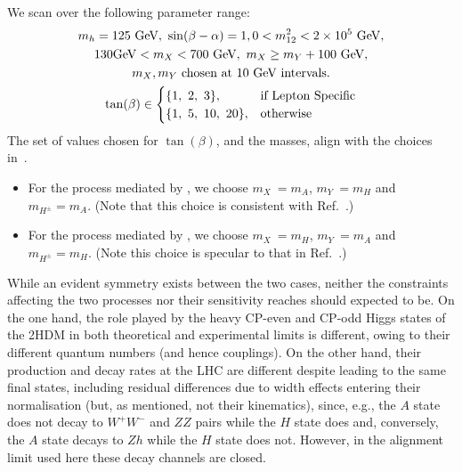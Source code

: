 We scan over the following parameter range:
\begin{equation}
\begin{gathered}
     m_{h} = 125~\text{GeV},~\sin(\beta-\alpha)=1, 0 < m_{12}^2 < 2\times 10^5~{\rm GeV},\\
     130 {\rm GeV} < m_X < 700~\text{GeV},~m_X \geq m_Y + 100~\text{GeV},\\
     m_X, m_Y~\text{chosen at}~10~\text{GeV intervals.}\\
     \tan(\beta)\in
         \begin{cases}
             \{1,~2,~3\}, & \text{if Lepton Specific}\\
             \{1,~5,~10,~20\}, & \text{otherwise}\\
         \end{cases}\\
\label{eq1}
\end{gathered}
\end{equation}
The set of values chosen for \(\tan(\beta)\), and the masses, align with the choices in~\cite{Aaboud:2018eoy}.
\begin{itemize}
    \item[\textbullet] For the process mediated by \AZH, we choose \(m_X~= m_A\), \(m_Y~= m_H\)  and \(m_{H^\pm} = m_A\). (Note that this choice is consistent with Ref.~\cite{Aaboud:2018eoy}.)
    \item[\textbullet] For the process mediated by \HZA, we choose \(m_X~= m_H\), \(m_Y~= m_A\)  and \(m_{H^\pm} = m_H\). (Note this choice is specular to that in Ref.~\cite{Aaboud:2018eoy}.) 
\end{itemize}


While an evident symmetry exists between the two cases, neither the constraints affecting the two processes nor their  sensitivity reaches should expected to be.
On the one hand, the role played by the heavy CP-even and CP-odd Higgs states of the 2HDM in both theoretical and experimental limits is different, owing to their different quantum numbers (and hence couplings).
On the other hand, their production and decay rates at the LHC are different despite leading to the same final states, including residual differences due to width effects entering their normalisation (but, as mentioned, not their kinematics), since, e.g., the $A$ state does not decay to $W^+W^-$ and $ZZ$ pairs while the $H$ state does and, conversely, the $A$ state decays to $Zh$ while the $H$ state does not.  
However, in the alignment limit used here these decay channels are closed.
